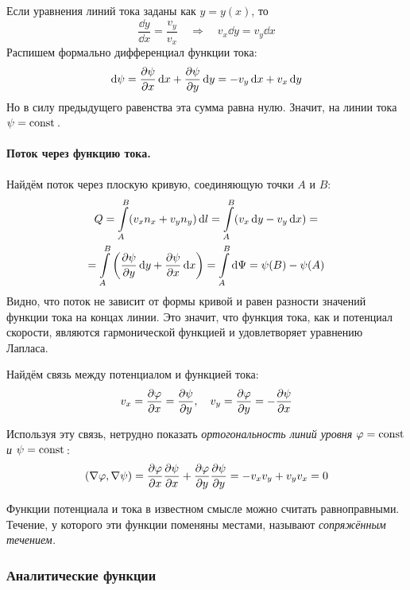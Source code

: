 Если уравнения линий тока заданы как $y=y(x)$, то 
\begin{equation}
    \frac{\dd{y}}{\dd{x}} = \frac{v_y}{v_x} 
    \quad\Rightarrow\quad 
    v_x \dd{y} = v_y \dd{x}
\end{equation}
Распишем формально дифференциал функции тока:
\begin{equation}
    \dd\psi = \pdv{\psi}{x}\dd{x} + \pdv{\psi}{y}\dd{y} =
    -v_y \dd{x} + v_x \dd{y}
\end{equation}
Но в силу предыдущего равенства эта сумма равна нулю. Значит, на линии тока $\psi = \mathrm{const}\,$.

\paragraph{Поток через функцию тока.} Найдём поток через плоскую
кривую, соединяющую точки $A$ и $B$:
\begin{gather}
    Q = \int\limits_A^B (v_x n_x + v_y n_y)\dd{l}=
    \int\limits_A^B (v_x \dd{y} - v_y \dd{x})=\\=
    \int\limits_A^B \qty(\pdv{\psi}{y}\dd{y}+\pdv{\psi}{x}\dd{x})=
    \int\limits_A^B \dd{\Psi} = \psi(B)-\psi(A)
\end{gather}
Видно, что поток не зависит от формы кривой и равен разности значений
функции тока на концах линии. Это значит, что функция тока, как и потенциал скорости, являются гармонической функцией и удовлетворяет уравнению Лапласа.

Найдём связь между потенциалом и функцией тока:
\begin{equation}
    v_x = \pdv{\varphi}{x}= \pdv{\psi}{y}, \quad
    v_y = \pdv{\varphi}{y} = -\pdv{\psi}{x}
\end{equation}

Используя эту связь, нетрудно показать \textit{ортогональность линий
уровня $\varphi=\mathrm{const}\,$ и $\psi=\mathrm{const}\,$}:
\begin{equation}
    \qty(\nabla\varphi,\nabla\psi) =
    \pdv{\varphi}{x}\pdv{\psi}{x} +
    \pdv{\varphi}{y}\pdv{\psi}{y} = -v_x v_y+ v_y v_x = 0
\end{equation}

Функции потенциала и тока в известном смысле можно считать равноправными. Течение, у которого эти функции поменяны местами, называют \textit{сопряжённым течением.}


\subsubsection{Аналитические функции}

